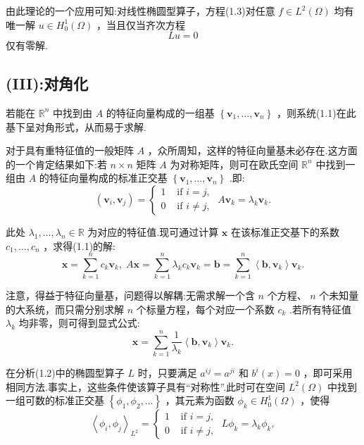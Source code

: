 由此理论的一个应用可知:对线性椭圆型算子，方程(1.3)对任意 $f \in  L^2\left( \Omega \right)$ 均有唯一解 $u \in  {H}_{0}^{1}\left( \Omega \right)$ ，当且仅当齐次方程
\[
{Lu} = 0
\]
仅有零解.

\subsection*{(III):对角化}\par

若能在 ${\mathbb{R}}^{n}$ 中找到由 $A$ 的特征向量构成的一组基 $\left\{  {{\bm{v}}_{1},\ldots ,{\bm{v}}_{n}}\right\}$ ，则系统(1.1)在此基下呈对角形式，从而易于求解.

对于具有重特征值的一般矩阵 $A$ ，众所周知，这样的特征向量基未必存在.这方面的一个肯定结果如下:若 $n \times  n$ 矩阵 $A$ 为对称矩阵，则可在欧氏空间 ${\mathbb{R}}^{n}$ 中找到一组由 $A$ 的特征向量构成的标准正交基 $\left\{  {{\bm{v}}_{1},\ldots ,{\bm{v}}_{n}}\right\}$ .即:
\[
\left( {{\bm{v}}_{i},{\bm{v}}_{j}}\right)  = \left\{  \begin{array}{ll} 1 & \text{ if }i = j, \\  0 & \text{ if }i \neq  j, \end{array}\right. \;A{\bm{v}}_{k} = {\lambda }_{k}{\bm{v}}_{k}.
\]

此处 ${\lambda }_{1},\ldots ,{\lambda }_{n} \in  \mathbb{R}$ 为对应的特征值.现可通过计算 $\bm{x}$ 在该标准正交基下的系数 ${c}_{1},\ldots ,{c}_{n}$ ，求得(1.1)的解:
\[
\bm{x} = \mathop{\sum }\limits_{{k = 1}}^{n}{c}_{k}{\bm{v}}_{k},\;A\bm{x} = \mathop{\sum }\limits_{{k = 1}}^{n}{\lambda }_{k}{c}_{k}{\bm{v}}_{k} = \bm{b} = \mathop{\sum }\limits_{{k = 1}}^{n}\left\langle  {\bm{b},{\bm{v}}_{k}}\right\rangle  {\bm{v}}_{k}.
\]

注意，得益于特征向量基，问题得以解耦:无需求解一个含 $n$ 个方程、 $n$ 个未知量的大系统，而只需分别求解 $n$ 个标量方程，每个对应一个系数 ${c}_{k}$ .若所有特征值 ${\lambda }_{k}$ 均非零，则可得到显式公式:
\begin{equation}\tag{1.5}
\bm{x} = \mathop{\sum }\limits_{{k = 1}}^{n}\frac{1}{{\lambda }_{k}}\left\langle  {\bm{b},{\bm{v}}_{k}}\right\rangle  {\bm{v}}_{k}.
\end{equation}

在分析(1.2)中的椭圆型算子 $L$ 时，只要满足 ${a}^{ij} = {a}^{ji}$ 和 ${b}^{i}\left( x\right)  = 0$ ，即可采用相同方法.事实上，这些条件使该算子具有“对称性”.此时可在空间 $L^2\left( \Omega \right)$ 中找到一组可数的标准正交基 $\left\{  {{\phi }_{1},{\phi }_{2},\ldots }\right\}$ ，其元素为函数 ${\phi }_{k} \in  {H}_{0}^{1}\left( \Omega \right)$ ，使得
\begin{equation}\tag{1.6}
{\left\langle  {\phi }_{i},{\phi }_{j}\right\rangle  }_{L^2} = \left\{  \begin{array}{ll} 1 & \text{ if }i = j, \\  0 & \text{ if }i \neq  j, \end{array}\right. \;L{\phi }_{k} = {\lambda }_{k}{\phi }_{k},
\end{equation}

